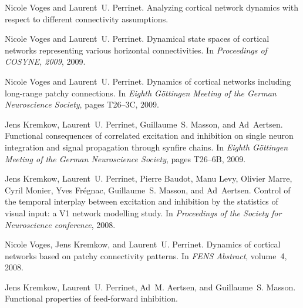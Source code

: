 \documentclass[11pt,french,a4paper,oneside]{article}%
\begin{document}
\begin{etaremune}
\item %
Nicole Voges and Laurent~U. Perrinet.
\newblock Analyzing cortical network dynamics with respect to different
  connectivity assumptions.

\item %
Nicole Voges and Laurent~U. Perrinet.
\newblock Dynamical state spaces of cortical networks representing various
  horizontal connectivities.
\newblock In \emph{Proceedings of COSYNE, 2009}, 2009.

\item %
Nicole Voges and Laurent~U. Perrinet.
\newblock Dynamics of cortical networks including long-range patchy
  connections.
\newblock In \emph{Eighth G{\"o}ttingen Meeting of the German Neuroscience
  Society}, pages T26--3C, 2009.
\item %
Jens Kremkow, Laurent~U. Perrinet, Guillaume~S. Masson, and Ad~Aertsen.
\newblock Functional consequences of correlated excitation and inhibition on
  single neuron integration and signal propagation through synfire chains.
\newblock In \emph{Eighth G{\"o}ttingen Meeting of the German Neuroscience
  Society}, pages T26--6B, 2009.

\item %
Jens Kremkow, Laurent~U. Perrinet, Pierre Baudot, Manu Levy, Olivier Marre,
  Cyril Monier, Yves Fr{\'e}gnac, Guillaume~S. Masson, and Ad~Aertsen.
\newblock Control of the temporal interplay between excitation and inhibition
  by the statistics of visual input: a {V}1 network modelling study.
\newblock In \emph{Proceedings of the Society for Neuroscience conference},
  2008.

\item %
Nicole Voges, Jens Kremkow, and Laurent~U. Perrinet.
\newblock Dynamics of cortical networks based on patchy connectivity patterns.
\newblock In \emph{FENS Abstract}, volume~4, 2008.
\item %
Jens Kremkow, Laurent~U. Perrinet, Ad~M. Aertsen, and Guillaume~S. Masson.
\newblock Functional properties of feed-forward inhibition.


\end{etaremune}
\end{document}
